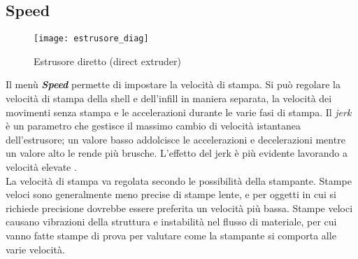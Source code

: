 \subsection{Speed}
\begin{wrapfigure} {R} {0.37\textwidth}
	\texttt{[image: estrusore\_diag]}
    \caption{Estrusore diretto (direct extruder)}
    \label{fig:estrusore_diag}
\end{wrapfigure}
Il menù \emph{\textbf{Speed}} permette di impostare la velocità di stampa. Si può regolare la velocità di stampa della shell e dell'infill in maniera separata, la velocità dei movimenti senza stampa e le accelerazioni durante le varie fasi di stampa.
Il \emph{jerk} è un parametro che gestisce il massimo cambio di velocità istantanea dell'estrusore; un valore basso addolcisce le accelerazioni e decelerazioni mentre un valore alto le rende più brusche. L'effetto del jerk è più evidente lavorando a velocità elevate \parencite{Reference53}.\\
La velocità di stampa va regolata secondo le possibilità della stampante. Stampe veloci sono generalmente meno precise di stampe lente, e per oggetti in cui si richiede precisione dovrebbe essere preferita un velocità più bassa. Stampe veloci causano vibrazioni della struttura e instabilità nel flusso di materiale, per cui vanno fatte stampe di prova per valutare come la stampante si comporta alle varie velocità.\\

